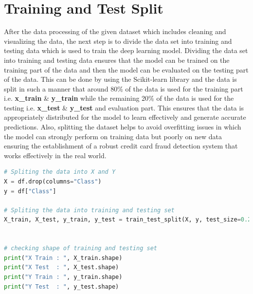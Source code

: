 \clearpage

 \section{Training and Test Split}
 After the data processing of the given dataset which includes cleaning and visualizing the data, the next step is to divide the data set into training and testing data which is used to train the deep learning model. Dividing the data set into training and testing data ensures that the model can be trained on the training part of the data and then the model can be evaluated on the testing part of the data. This can be done by using the Scikit-learn library and the data is split in such a manner that around 80\% of the data is used for the training part i.e.\textbf{ x\_train }\& \textbf{y\_train }while the remaining 20\% of the data is used for the testing i.e. \textbf{x\_test }\&\textbf{ y\_test} and evaluation part. This ensures that the data is appropriately distributed for the model to learn effectively and generate accurate predictions. Also, splitting the dataset helps to avoid overfitting issues in which the model can strongly perform on training data but poorly on new data ensuring the establishment of a robust credit card fraud detection system that works effectively in the real world.

\begin{lstlisting}[language=Python, caption={Splitting Data into Train and Test}, label=list:python_code_ex]
# Spliting the data into X and Y
X = df.drop(columns="Class")
y = df["Class"]

# Spliting the data into training and testing set
X_train, X_test, y_train, y_test = train_test_split(X, y, test_size=0.25, random_state=42)


# checking shape of training and testing set
print("X Train : ", X_train.shape)
print("X Test  : ", X_test.shape)
print("Y Train : ", y_train.shape)
print("Y Test  : ", y_test.shape)
\end{lstlisting}

